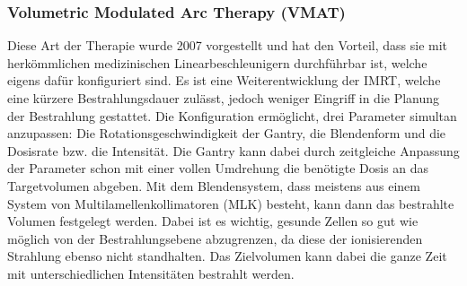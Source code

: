 \subsubsection{Volumetric Modulated Arc Therapy (VMAT)}
Diese Art der Therapie wurde 2007 vorgestellt und hat den Vorteil, dass sie mit herkömmlichen medizinischen Linearbeschleunigern durchführbar ist, welche eigens dafür konfiguriert sind.\cite{nicht_so_shady_author}
Es ist eine Weiterentwicklung der IMRT, welche eine kürzere Bestrahlungsdauer zulässt, jedoch weniger Eingriff in die Planung der Bestrahlung gestattet.
Die Konfiguration ermöglicht, drei Parameter simultan anzupassen: Die Rotationsgeschwindigkeit der Gantry, die Blendenform und die Dosisrate bzw. die Intensität. 
Die Gantry kann dabei durch zeitgleiche Anpassung der Parameter schon mit einer vollen Umdrehung die benötigte Dosis an das Targetvolumen abgeben.
Mit dem Blendensystem, dass meistens aus einem System von Multilamellenkollimatoren (MLK) besteht, kann dann das bestrahlte Volumen festgelegt werden.
Dabei ist es wichtig, gesunde Zellen so gut wie möglich von der Bestrahlungsebene abzugrenzen, da diese der ionisierenden Strahlung ebenso nicht standhalten.
Das Zielvolumen kann dabei die ganze Zeit mit unterschiedlichen Intensitäten bestrahlt werden.\cite{haha_ka}






